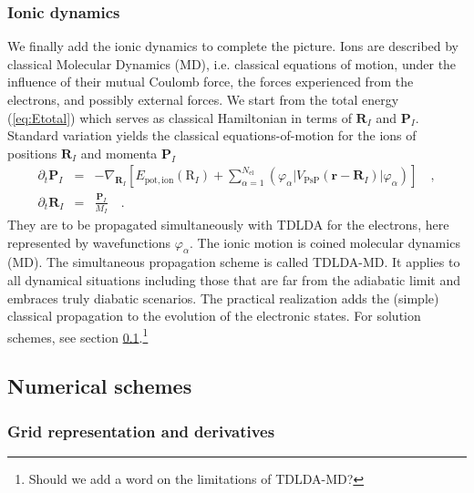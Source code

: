 \documentclass[final,1p]{elsarticle}
\newcommand{\PGRfoot}[1]{{\color{blue}\footnote{\color{blue} #1}}}
\begin{document}
\subsubsection{Ionic dynamics}
\label{sec:TDLDA-MD2}



We finally add the ionic dynamics to complete the picture. Ions are
described by classical Molecular Dynamics (MD), i.e.  classical
equations of motion, under the influence of their mutual Coulomb
force, the forces experienced from the electrons, and possibly
external forces.  We start from the total energy (\ref{eq:Etotal})
which serves as classical Hamiltonian in terms of $\mathbf{R}_I$ and
$\mathbf{P}_I$. Standard variation yields the classical
equations-of-motion for the ions of positions $\mathbf{R}_I$ and
momenta $\mathbf{P}_I$
\begin{subequations}
\label{eq:propion}
\begin{eqnarray}
  \partial_t\mathbf{P}_I
  &=&
  -\nabla_{\mathbf{R}_I}\left[
    E_\mathrm{pot,ion}(\mathrm{R}_I)
    +
    \sum_{\alpha=1}^{N_\mathrm{el}}
    \left(\varphi_\alpha|V_\mathrm{PsP}^{\mbox{}}(\mathbf{r}-\mathbf{R}_I)|
          \varphi_\alpha\right)
  \right]
  \quad,
\label{eq:propionP}
\\
  \partial_t\mathbf{R}_I
  &=&
  \frac{\mathbf{P}_I}{M_I}
  \quad.
\end{eqnarray}
\end{subequations}
They are to be propagated simultaneously with TDLDA for the electrons, here
represented by wavefunctions $\varphi_\alpha$.
The ionic motion is coined molecular dynamics (MD).
The simultaneous propagation scheme is called TDLDA-MD.
It applies to all dynamical situations including those that are
far from the adiabatic limit and embraces truly diabatic scenarios.
The practical realization adds the (simple) classical propagation
to the evolution of the electronic states. For solution schemes, see
section \ref{sec:numerics}.\PGRfoot{Should we add a word on the
limitations of TDLDA-MD?}


\subsection{Numerical schemes}
\label{sec:numerics}

\subsubsection{Grid representation and derivatives}
\label{sec:grid}
\end{document}
